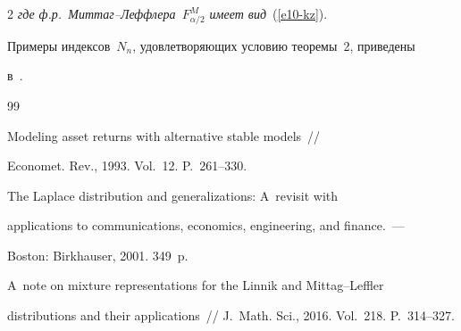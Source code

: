 \begin{multicols}{2}
\textit{где ф.р.\ Мит\-таг--Леф\-фле\-ра~$F^{M}_{\alpha/2}$ имеет вид}~(\ref{e10-kz}).





\vspace*{3pt}





Примеры индексов~$N_n$, удовлетворяющих условию теоремы~2, приведены


в~\cite{KorolevZeifman2016b}.





\vspace*{-12pt}








{\small\frenchspacing


 {%




 \begin{thebibliography}{99}




 Modeling asset returns with alternative stable models~// 


Economet. Rev., 1993. Vol.~12. P.~261--330.









The Laplace distribution and generalizations: A~revisit with 


applications to communications, economics, engineering, and finance.~--- 


Boston: Birkhauser, 2001. 349~p.









A~note on mixture representations for the Linnik and Mittag--Leffler 


distributions and their applications~// J.~Math. Sci., 2016. Vol.~218. P.~314--327.








\end{thebibliography}}}
\end{multicols}
